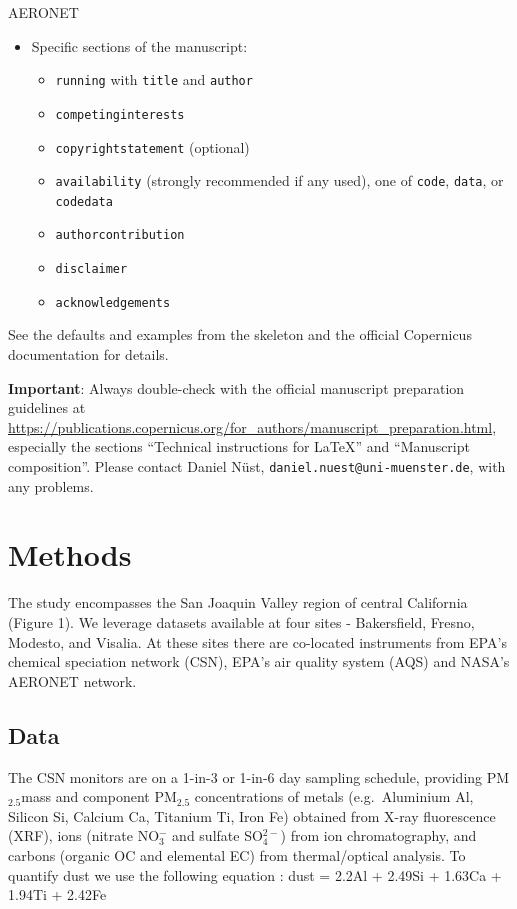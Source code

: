\documentclass[, manuscript]{copernicus}
\begin{document}
AERONET \cite{Holben1998, Shin2018, Shin2019b, Shin2019}

\begin{itemize}
\item
  Specific sections of the manuscript:

  \begin{itemize}
  \item
    \texttt{running} with \texttt{title} and \texttt{author}
  \item
    \texttt{competinginterests}
  \item
    \texttt{copyrightstatement} (optional)
  \item
    \texttt{availability} (strongly recommended if any used), one of
    \texttt{code}, \texttt{data}, or \texttt{codedata}
  \item
    \texttt{authorcontribution}
  \item
    \texttt{disclaimer}
  \item
    \texttt{acknowledgements}
  \end{itemize}
\end{itemize}

See the defaults and examples from the skeleton and the official
Copernicus documentation for details.

\textbf{Important}: Always double-check with the official manuscript
preparation guidelines at
\url{https://publications.copernicus.org/for_authors/manuscript_preparation.html},
especially the sections ``Technical instructions for LaTeX'' and
``Manuscript composition''. Please contact Daniel Nüst,
\texttt{daniel.nuest@uni-muenster.de}, with any problems.

\section{Methods}

The study encompasses the San Joaquin Valley region of central
California (Figure 1). We leverage datasets available at four sites -
Bakersfield, Fresno, Modesto, and Visalia. At these sites there are
co-located instruments from EPA's chemical speciation network (CSN),
EPA's air quality system (AQS) and NASA's AERONET network.

\subsection{Data}

The CSN monitors are on a 1-in-3 or 1-in-6 day sampling schedule,
providing PM\(_{2.5}\)mass and component PM\(_{2.5}\) concentrations of
metals (e.g.~Aluminium Al, Silicon Si, Calcium Ca, Titanium Ti, Iron Fe)
obtained from X-ray fluorescence (XRF), ions (nitrate NO\(_{3}^-\) and
sulfate SO\(_4^{2-}\)) from ion chromatography, and carbons (organic OC
and elemental EC) from thermal/optical analysis. To quantify dust we use
the following equation \citet{Chow2015}: dust = 2.2Al + 2.49Si + 1.63Ca
+ 1.94Ti + 2.42Fe
\end{document}
